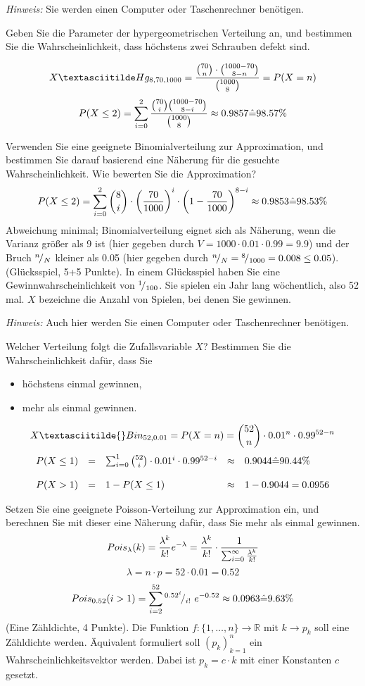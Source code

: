 \documentclass[twoside]{article}
\begin{document}
	\textit{Hinweis:} Sie werden einen Computer oder Taschenrechner benötigen.

	Geben Sie die Parameter der hypergeometrischen Verteilung an, und bestimmen Sie die Wahrscheinlichkeit, dass höchstens zwei Schrauben defekt sind.
	
	\[
		X \textasciitilde Hg_{8,70,1000} = \frac{\binom{70}{n} \cdot \binom{1000-70}{8-n}}{\binom{1000}{8}} = P(X=n)
	\]
	\[
		P(X \leq 2) = \sum_{i= 0}^{2} \frac{\binom{70}{i} \binom{1000-70}{8-i}}{\binom{1000}{8}}\approx 0.9857 \hat{=} 98.57\%
	\]
	
	Verwenden Sie eine geeignete Binomialverteilung zur Approximation, und bestimmen Sie darauf basierend eine Näherung für die gesuchte Wahrscheinlichkeit.
	Wie bewerten Sie die Approximation?
	\[
		P(X\leq 2) = \sum_{i= 0}^{2}\binom{8}{i}\cdot\left(\frac{70}{1000}\right)^i\cdot\left(1-\frac{70}{1000}\right)^{8-i} \approx 0.9853 \hat{=} 98.53\%
	\]
	Abweichung minimal; Binomialverteilung eignet sich als Näherung, wenn die Varianz größer als 9 ist (hier gegeben durch $V=1000\cdot0.01\cdot0.99=9.9$) und der Bruch ${}^{n}\!/_{N}$ kleiner als 0.05 (hier gegeben durch ${}^{n}\!/_{N}={}^{8}\!/_{1000}=0.008 \leq 0.05$).
	(Glücksspiel, 5+5 Punkte).
	In einem Glücksspiel haben Sie eine Gewinnwahrscheinlichkeit von ${}^{1}\!/_{100}$.
	Sie spielen ein Jahr lang wöchentlich, also 52 mal.
	$X$ bezeichne die Anzahl von Spielen, bei denen Sie gewinnen.
	
	\textit{Hinweis:} Auch hier werden Sie einen Computer oder Taschenrechner benötigen.
	
	Welcher Verteilung folgt die Zufallsvariable $X$?
	Bestimmen Sie die Wahrscheinlichkeit dafür, dass Sie
	\begin{itemize}
		\item höchstens einmal gewinnen,
		\item mehr als einmal gewinnen.
	\end{itemize}
	\[
		X \textasciitilde{} Bin_{52,0.01} = P(X=n)=\binom{52}{n}\cdot 0.01^n \cdot 0.99^{52-n}
	\]
	\[
		\begin{array}{lllll}
			P(X\leq 1)&=&\sum_{i= 0}^{1}\binom{52}{i} \cdot 0.01^i \cdot 0.99^{52-i} &\approx& 0.9044 \hat{=} 90.44\%\\
			\\
			P(X > 1) &=& 1-P(X\leq 1) &\approx& 1-0.9044=0.0956 
		\end{array}
	\]
	
	Setzen Sie eine geeignete Poisson-Verteilung zur Approximation ein, und berechnen Sie mit dieser eine Näherung dafür, dass Sie mehr als einmal gewinnen.
	\[
		Pois_{\lambda}(k)=\frac{\lambda^k}{k!}e^{-\lambda}=\frac{\lambda^k}{k!} \cdot \frac{1}{\sum_{i= 0}^{\infty}\frac{\lambda^k}{k!}}
	\]
	\[
		\lambda=n \cdot p=52\cdot0.01=0.52
	\]
	\[
		Pois_{0.52}(i>1)=\sum_{i= 2}^{52}{}^{0.52^i}\!/_{i!}~e^{-0.52}\approx0.0963 \hat{=} 9.63\%
	\]
	(Eine Zähldichte, 4 Punkte).
	Die Funktion $f:\{1,\dots,n\} \rightarrow \mathbb{R}$ mit $k \rightarrow p_k$ soll eine Zähldichte werden.
	Äquivalent formuliert soll $(p_k)_{k=1}^{n}$ ein Wahrscheinlichkeitsvektor werden.
	Dabei ist $p_k=c \cdot k$ mit einer Konstanten $c$ gesetzt.
	
\end{document}
